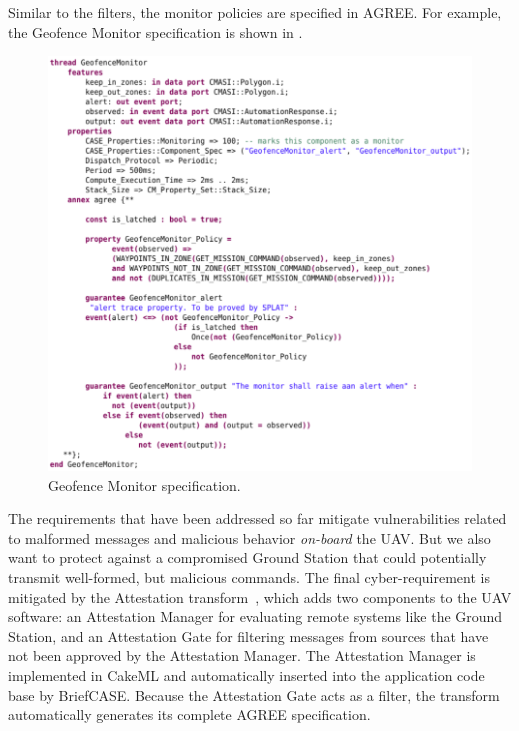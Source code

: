 Similar to the filters, the monitor policies are specified in AGREE. For example, 
the Geofence Monitor specification is shown in . 


\begin{figure}[h]
	\centering
	\includegraphics[width=1\columnwidth]{figs/geofence-monitor.png}
	\caption{Geofence Monitor specification.} 
	\label{fig:geofence-monitor} 
\end{figure}

The requirements that have been addressed so far mitigate vulnerabilities related to malformed messages and malicious behavior \textit{on-board} the UAV.  But we also want to protect against a compromised Ground Station that could potentially transmit well-formed, but malicious commands. The final cyber-requirement is mitigated by the Attestation transform~\cite{attestation-copland}, which adds two components to the UAV software: an Attestation Manager for evaluating remote systems like the Ground Station, and an Attestation Gate for filtering messages from sources that have not been approved by the Attestation Manager.  The Attestation Manager is implemented in CakeML and automatically inserted into the application code base by BriefCASE.  Because the Attestation Gate acts as a filter, the transform automatically generates its complete AGREE specification.%

